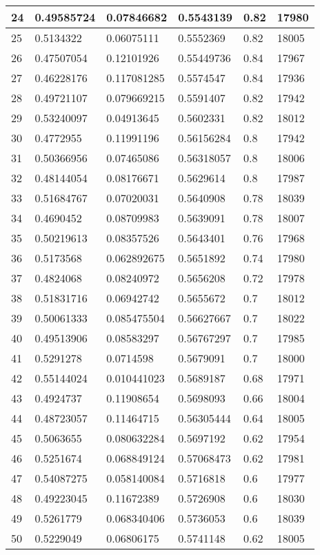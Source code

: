 \begin{longtable}{|l|l|l|l|l|l|}
24 & 0.49585724 & 0.07846682 & 0.5543139 & 0.82 & 17980 \\ \hline 
25 & 0.5134322 & 0.06075111 & 0.5552369 & 0.82 & 18005 \\ \hline 
26 & 0.47507054 & 0.12101926 & 0.55449736 & 0.84 & 17967 \\ \hline 
27 & 0.46228176 & 0.117081285 & 0.5574547 & 0.84 & 17936 \\ \hline 
28 & 0.49721107 & 0.079669215 & 0.5591407 & 0.82 & 17942 \\ \hline 
29 & 0.53240097 & 0.04913645 & 0.5602331 & 0.82 & 18012 \\ \hline 
30 & 0.4772955 & 0.11991196 & 0.56156284 & 0.8 & 17942 \\ \hline 
31 & 0.50366956 & 0.07465086 & 0.56318057 & 0.8 & 18006 \\ \hline 
32 & 0.48144054 & 0.08176671 & 0.5629614 & 0.8 & 17987 \\ \hline 
33 & 0.51684767 & 0.07020031 & 0.5640908 & 0.78 & 18039 \\ \hline 
34 & 0.4690452 & 0.08709983 & 0.5639091 & 0.78 & 18007 \\ \hline 
35 & 0.50219613 & 0.08357526 & 0.5643401 & 0.76 & 17968 \\ \hline 
36 & 0.5173568 & 0.062892675 & 0.5651892 & 0.74 & 17980 \\ \hline 
37 & 0.4824068 & 0.08240972 & 0.5656208 & 0.72 & 17978 \\ \hline 
38 & 0.51831716 & 0.06942742 & 0.5655672 & 0.7 & 18012 \\ \hline 
39 & 0.50061333 & 0.085475504 & 0.56627667 & 0.7 & 18022 \\ \hline 
40 & 0.49513906 & 0.08583297 & 0.56767297 & 0.7 & 17985 \\ \hline 
41 & 0.5291278 & 0.0714598 & 0.5679091 & 0.7 & 18000 \\ \hline 
42 & 0.55144024 & 0.010441023 & 0.5689187 & 0.68 & 17971 \\ \hline 
43 & 0.4924737 & 0.11908654 & 0.5698093 & 0.66 & 18004 \\ \hline 
44 & 0.48723057 & 0.11464715 & 0.56305444 & 0.64 & 18005 \\ \hline 
45 & 0.5063655 & 0.080632284 & 0.5697192 & 0.62 & 17954 \\ \hline 
46 & 0.5251674 & 0.068849124 & 0.57068473 & 0.62 & 17981 \\ \hline 
47 & 0.54087275 & 0.058140084 & 0.5716818 & 0.6 & 17977 \\ \hline 
48 & 0.49223045 & 0.11672389 & 0.5726908 & 0.6 & 18030 \\ \hline 
49 & 0.5261779 & 0.068340406 & 0.5736053 & 0.6 & 18039 \\ \hline 
50 & 0.5229049 & 0.06806175 & 0.5741148 & 0.62 & 18005 \\ \hline 
\end{longtable}